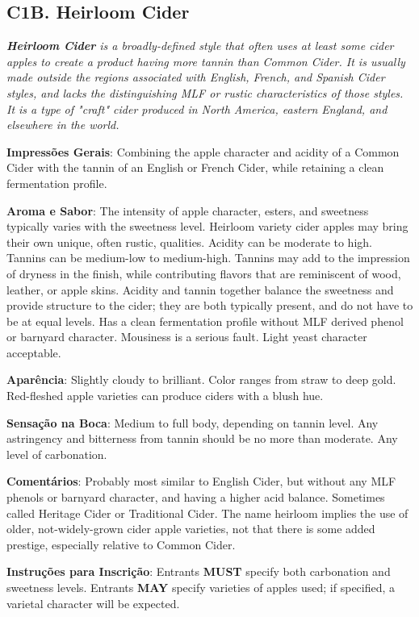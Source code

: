 \subsection*{C1B. Heirloom Cider}

\textit{\textbf{Heirloom Cider} is a broadly-defined style that often uses at least some cider apples to create a product having more tannin than Common Cider. It is usually made outside the regions associated with English, French, and Spanish Cider styles, and lacks the distinguishing MLF or rustic characteristics of those styles. It is a type of "craft" cider produced in North America, eastern England, and elsewhere in the world.}

\textbf{Impressões Gerais}: Combining the apple character and acidity of a Common Cider with the tannin of an English or French Cider, while retaining a clean fermentation profile.

\textbf{Aroma e Sabor}: The intensity of apple character, esters, and sweetness typically varies with the sweetness level. Heirloom variety cider apples may bring their own unique, often rustic, qualities. Acidity can be moderate to high. Tannins can be medium-low to medium-high. Tannins may add to the impression of dryness in the finish, while contributing flavors that are reminiscent of wood, leather, or apple skins. Acidity and tannin together balance the sweetness and provide structure to the cider; they are both typically present, and do not have to be at equal levels. Has a clean fermentation profile without MLF derived phenol or barnyard character. Mousiness is a serious fault. Light yeast character acceptable.

\textbf{Aparência}: Slightly cloudy to brilliant. Color ranges from straw to deep gold. Red-fleshed apple varieties can produce ciders with a blush hue.

\textbf{Sensação na Boca}: Medium to full body, depending on tannin level. Any astringency and bitterness from tannin should be no more than moderate. Any level of carbonation.

\textbf{Comentários}: Probably most similar to English Cider, but without any MLF phenols or barnyard character, and having a higher acid balance. Sometimes called Heritage Cider or Traditional Cider. The name heirloom implies the use of older, not-widely-grown cider apple varieties, not that there is some added prestige, especially relative to Common Cider.

\textbf{Instruções para Inscrição}: Entrants \textbf{MUST} specify both carbonation and sweetness levels. Entrants \textbf{MAY} specify varieties of apples used; if specified, a varietal character will be expected.


